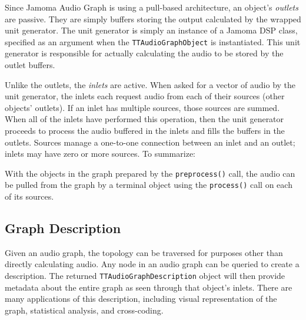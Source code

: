 \documentclass[twoside,a4paper]{article}
\begin{document}
Since Jamoma Audio Graph is using a pull-based architecture, an object's \emph{outlets} are passive.  
They are simply buffers storing the output calculated by the wrapped unit generator.  
The unit generator is simply an instance of a Jamoma DSP class, specified as an argument when the \texttt{TTAudioGraphObject} is instantiated. 
This unit generator is responsible for actually calculating the audio to be stored by the outlet buffers.

Unlike the outlets, the \emph{inlets} are active.  
When asked for a vector of audio by the unit generator, the inlets each request audio from each of their sources (other objects' outlets).  
If an inlet has multiple sources, those sources are summed.  
When all of the inlets have performed this operation, then the unit generator proceeds to process the audio buffered in the inlets and fills the buffers in the outlets.  
Sources manage a one-to-one connection between an inlet and an outlet; inlets may have zero or more sources.  
To summarize:

With the objects in the graph prepared by the \texttt{preprocess()} call, the audio can be pulled from the graph by a terminal object using the \texttt{process()} call on each of its sources.





\subsection{Graph Description} %

Given an audio graph, the topology can be traversed for purposes other than directly calculating audio.  
Any node in an audio graph can be queried to create a description.  The returned \texttt{TTAudioGraphDescription} object will then provide metadata about the entire graph as seen through that object's inlets.  
There are many applications of this description, including visual representation of the graph, statistical analysis, and cross-coding.
\end{document}
